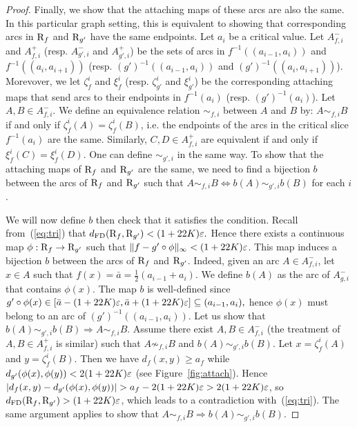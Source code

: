 \begin{proof}
Finally, we show that the attaching maps of these arcs are also the
same.  In this particular graph setting, this is equivalent to showing
that corresponding arcs in $\mathrm{R}_f$ and $\mathrm{R}_{g'}$ have the same
endpoints.  Let $a_i$ be a critical value. Let $A_{f,i}^-$ and
$A_{f,i}^+$ (resp. $A_{g',i}^-$ and $A_{g',i}^+$) be the sets of arcs
in $f^{-1}((a_{i-1},a_i))$ and $f^{-1}((a_{i},a_{i+1}))$
(resp. $(g')^{-1}((a_{i-1},a_i))$ and $(g')^{-1}((a_{i},a_{i+1}))$).
Morevover, we let $\zeta_f^i$ and $\xi_f^i$ (resp. $\zeta_{g'}^i$ and
$\xi_{g'}^i$) be the corresponding attaching maps that send arcs to
their endpoints in $f^{-1}(a_i)$ (resp. $(g')^{-1}(a_i)$).  Let
$A,B\in A_{f,i}^-$. We define an equivalence relation $\sim_{f,i}$
between $A$ and $B$ by: $A\sim_{f,i} B$ if and only if $\zeta_f^i(A)=\zeta_f^i(B)$,
i.e. the endpoints of the arcs in the critical slice $f^{-1}(a_i)$ are
the same.  Similarly, $C,D\in A_{f,i}^+$ are equivalent if and only if
$\xi_f^i(C)=\xi_f^i(D)$.  One can define $\sim_{g',i}$ in the same way.
%
To show that the attaching maps of $\mathrm{R}_f$ and $\mathrm{R}_{g'}$ are the same,
we need to find a bijection $b$ between the arcs of $\mathrm{R}_f$ and $\mathrm{R}_{g'}$ 
such that $A\sim_{f,i}B \Leftrightarrow b(A)\sim_{g',i}b(B)$ for each $i$.

We will now define $b$ then check that it satisfies the condition.
Recall from~(\ref{eq:tri}) that 
$d_{\rm FD}(\mathrm{R}_f,\mathrm{R}_{g'})< (1+22K)\varepsilon.$
Hence there exists a continuous map $\phi:\mathrm{R}_f\rightarrow\mathrm{R}_{g'}$ such that
$\|f-g'\circ\phi\|_\infty < (1+22K)\varepsilon$.
This map induces a bijection $b$ between the arcs of $\mathrm{R}_f$ and $\mathrm{R}_{g'}$.
Indeed, given an arc $A\in A_{f,i}^-$, let $x\in A$ such that $f(x)=\bar{a}=\frac{1}{2}(a_{i-1}+a_i)$. 
We define $b(A)$ as the arc of $A_{g,i}^-$ that contains $\phi(x)$.
The map $b$ is well-defined since 
$g'\circ\phi(x)\in\left[\bar a-(1+22K)\varepsilon,\bar a+(1+22K)\varepsilon\right]\subseteq(a_{i-1},a_i),$
hence $\phi(x)$	must belong to an arc of $(g')^{-1}((a_{i-1},a_i))$.
Let us show that  $b(A)\sim_{g',i}b(B)\Rightarrow A\sim_{f,i} B$.
Assume there exist $A,B\in A_{f,i}^-$ (the treatment of $A,B\in A_{f,i}^+$ is similar) such that $A\not\sim_{f,i} B$
and $b(A)\sim_{g',i} b(B)$. 
Let $x=\zeta_f^i(A)$ and $y=\zeta_f^i(B)$. Then we have $d_f(x,y)\geq a_f$ while $d_{g'}(\phi(x),\phi(y)) < 2(1+22K)\varepsilon$
(see Figure~\ref{fig:attach}).
Hence $|d_f(x,y)-d_{g'}(\phi(x),\phi(y))| > a_f - 2(1+22K)\varepsilon > 2(1+22K)\varepsilon$,
so $d_{\rm FD}(\mathrm{R}_f,\mathrm{R}_{g'}) > (1+22K)\varepsilon$, which leads to a contradiction with~(\ref{eq:tri}).
The same argument applies to show that $ A\sim_{f,i} B\Rightarrow b(A)\sim_{g',i}b(B)$.
\end{proof}

